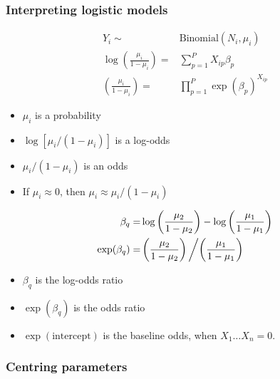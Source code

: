 \documentclass[
  openany]{book}
\newenvironment{Shaded}{\begin{snugshade}}{\end{snugshade}}
\newcommand{\FunctionTok}[1]{\textcolor[rgb]{0.00,0.00,0.00}{#1}}
\newcommand{\NormalTok}[1]{#1}
\newcommand{\SpecialCharTok}[1]{\textcolor[rgb]{0.00,0.00,0.00}{#1}}
\providecommand{\tightlist}{%
  \setlength{\itemsep}{0pt}\setlength{\parskip}{0pt}}
\begin{document}
\hypertarget{interpreting-logistic-models}{%
\subsubsection{Interpreting logistic models}\label{interpreting-logistic-models}}

\begin{align*}
Y_i \sim & \text{Binomial}(N_i, \mu_i)\\
\log\left(\frac{\mu_i}{1-\mu_i}\right) = & \sum_{p=1}^P X_{ip} \beta_p\\
\left(\frac{\mu_i}{1-\mu_i}\right) = & \prod_{p=1}^P \exp(\beta_p)^{X_{ip}}
\end{align*}

\begin{itemize}
\tightlist
\item
  \(\mu_i\) is a probability
\item
  \(\log[\mu_i / (1-\mu_i)]\) is a log-odds
\item
  \(\mu_i / (1-\mu_i)\) is an odds
\item
  If \(\mu_i \approx 0\), then \(\mu_i \approx \mu_i / (1-\mu_i)\)
\end{itemize}

\begin{align*}
\beta_q = &\log\left(\frac{\mu_2}{1-\mu_2}\right) - \log\left(\frac{\mu_1}{1-\mu_1}\right) \\
\exp(\beta_q) = & \left(\frac{\mu_2}{1-\mu_2}\right) \left/ \left(\frac{\mu_1}{1-\mu_1}\right)\right. \\
\end{align*}

\begin{itemize}
\tightlist
\item
  \(\beta_q\) is the log-odds ratio
\item
  \(\exp(\beta_q)\) is the odds ratio
\item
  \(\exp(\text{intercept})\) is the baseline odds, when
  \(X_{1} \ldots X_{n} = 0\).
\end{itemize}

\hypertarget{centring-parameters}{%
\subsubsection{Centring parameters}\label{centring-parameters}}

\begin{Shaded}
\end{Shaded}
\end{document}
